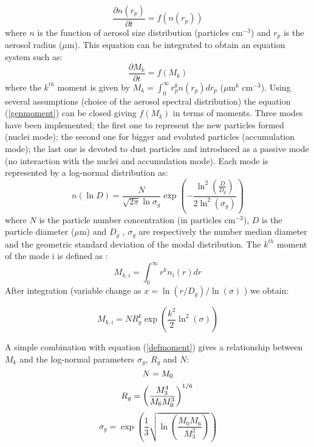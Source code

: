 \begin{equation}
\frac{\partial n(r_p)}{\partial t} = f(n(r_p))
\label{eqanal}
\end{equation}
where $n$ is the function of aerosol size distribution (particles cm$^{-3}$) 
and $r_p$ is the aerosol radius ($\mu$m).
This equation can be integrated to obtain an equation system such as: 
\begin{equation}
\frac{\partial M_k}{\partial t} = f(M_k)
\label{genmoment}
\end{equation}
where the $k^{th}$ moment is given by $M_k = \int_{0}^{\infty} r_{p}^{k} n(r_p) 
dr_p$ ($\mu$m$^k$ cm$^{-3}$).
Using several assumptions (choice of the aerosol spectral distribution) the 
equation (\ref{genmoment})
can be closed giving $f(M_k)$ in terms of moments.
Three modes have been implemented; the first one to represent the new particles 
formed (nuclei mode); the second one
for bigger and evoluted particles (accumulation mode); the last one is devoted to 
dust particles and introduced as a passive mode (no interaction with the nuclei and 
accumulation mode). Each mode is represented by a log-normal distribution as:
\begin{equation}
 n(\ln D) = \frac{N}{\sqrt{2 \pi} \ln{\sigma_g}} \exp \left(- \frac{\ln^2 (\frac{D}{D_g})}{2 \ln^2(\sigma_g)}\right) \label{distribution}
\end{equation}
where $N$ is the particle number concentration (in particles cm$^{-3}$), $D$ is the particle diameter ($\mu$m) and $D_g$
, $\sigma_g$ are respectively the number median diameter and the geometric 
standard deviation of the modal distribution.
The $k^{th}$ moment of the mode i is defined as :
\begin{equation}
M_{k,i} = \int_{0}^{\infty} r^k n_i(r) dr
\label{defmomentint}
\end{equation}
After integration (variable change as $ x = \ln (r/D_g) / \ln(\sigma)$ ) we 
obtain:

\begin{equation}
M_{k,i} =  N R^{k}_g \exp \left(\frac{k^2}{2} \ln^2 (\sigma)\right)
\label{defmoment}
\end{equation}

A simple combination with equation (\ref{defmoment}) gives a relationship between 
$M_k$ and the log-normal parameters $\sigma_g$, $R_g$ and $N$:
\begin{equation}
N = M_0 \\
\label{number}
\end{equation}
\begin{equation}
R_g = \left( \frac{M_3^4}{M_6 M_0^3} \right)^{1/6} \\
\label{radius}
\end{equation}
\begin{equation}
\sigma_g = \exp \left( \frac{1}{3} \sqrt{\ln \left( \frac{M_0 M_6}{M_3^2} 
\right)} \right)
\label{sigma}
\end{equation}



